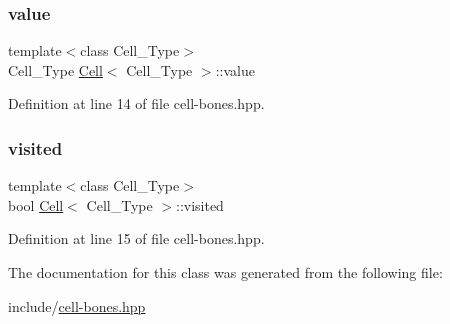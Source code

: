 \subsubsection{\texorpdfstring{value}{value}}
{\footnotesize\ttfamily template$<$class Cell\+\_\+\+Type$>$ \\
Cell\+\_\+\+Type \hyperlink{class_cell}{Cell}$<$ Cell\+\_\+\+Type $>$\+::value}



Definition at line 14 of file cell-\/bones.\+hpp.

\mbox{\label{class_cell_a1f539a05953fa05d723c32e718f0eeb3}} 
\subsubsection{\texorpdfstring{visited}{visited}}
{\footnotesize\ttfamily template$<$class Cell\+\_\+\+Type$>$ \\
bool \hyperlink{class_cell}{Cell}$<$ Cell\+\_\+\+Type $>$\+::visited}



Definition at line 15 of file cell-\/bones.\+hpp.



The documentation for this class was generated from the following file\+:\begin{DoxyCompactItemize}
\item 
include/\hyperlink{cell-bones_8hpp}{cell-\/bones.\+hpp}\end{DoxyCompactItemize}
